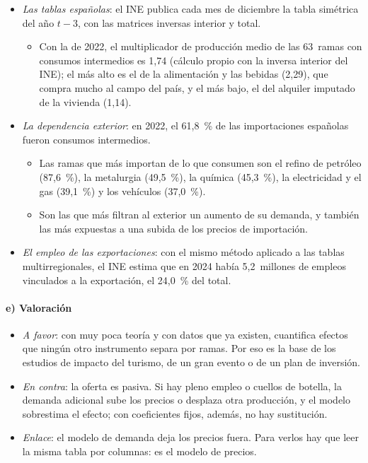 \documentclass[11pt]{article}
\begin{document}
\begin{itemize}
\item \emph{Las tablas españolas}: el INE publica cada mes de diciembre la tabla simétrica del año $t-3$, con las matrices inversas interior y total\nocite{INE2025TIO2022}.
  \begin{itemize}
  \item Con la de 2022, el multiplicador de producción medio de las 63~ramas con consumos intermedios es 1,74 (cálculo propio con la inversa interior del INE); el más alto es el de la alimentación y las bebidas (2,29), que compra mucho al campo del país, y el más bajo, el del alquiler imputado de la vivienda (1,14)\nocite{INE2025TIODatos}.
  \end{itemize}
\item \emph{La dependencia exterior}: en 2022, el 61,8~\% de las importaciones españolas fueron consumos intermedios\nocite{INE2025TIO2022}.
  \begin{itemize}
  \item Las ramas que más importan de lo que consumen son el refino de petróleo (87,6~\%), la metalurgia (49,5~\%), la química (45,3~\%), la electricidad y el gas (39,1~\%) y los vehículos (37,0~\%).
  \item Son las que más filtran al exterior un aumento de su demanda, y también las más expuestas a una subida de los precios de importación.
  \end{itemize}
\item \emph{El empleo de las exportaciones}: con el mismo método aplicado a las tablas multirregionales, el INE estima que en 2024 había 5,2~millones de empleos vinculados a la exportación, el 24,0~\% del total\nocite{INE2026TiVA2024}.
\end{itemize}

\paragraph{e) Valoración}

\begin{itemize}
\item \emph{A favor}: con muy poca teoría y con datos que ya existen, cuantifica efectos que ningún otro instrumento separa por ramas. Por eso es la base de los estudios de impacto del turismo, de un gran evento o de un plan de inversión.
\item \emph{En contra}: la oferta es pasiva. Si hay pleno empleo o cuellos de botella, la demanda adicional sube los precios o desplaza otra producción, y el modelo sobrestima el efecto; con coeficientes fijos, además, no hay sustitución.
\item \emph{Enlace}: el modelo de demanda deja los precios fuera. Para verlos hay que leer la misma tabla por columnas: es el modelo de precios.
\end{itemize}
\end{document}
